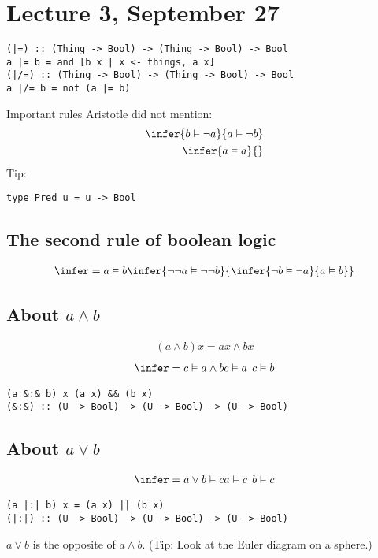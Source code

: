 \documentclass{article}
\begin{document}
\section{Lecture 3, September 27}
\begin{verbatim}
(|=) :: (Thing -> Bool) -> (Thing -> Bool) -> Bool
a |= b = and [b x | x <- things, a x]
(|/=) :: (Thing -> Bool) -> (Thing -> Bool) -> Bool
a |/= b = not (a |= b)
\end{verbatim}
Important rules Aristotle did not mention:
\begin{align}
	\infer{b \vDash \neg a}{a \vDash \neg b} \\
	\infer{a \vDash a}{}
\end{align}
Tip:
\begin{verbatim}
type Pred u = u -> Bool
\end{verbatim}
\subsection{The second rule of boolean logic}
\begin{align}
	\infer={a\vDash b}{
	\infer{\neg\neg a \vDash \neg\neg b}{
		\infer{\neg b \vDash \neg a}{
			a \vDash b
		}
	}
	}
\end{align}
\subsection{About $a\wedge b$}
\begin{align}
	(a\wedge b)x = ax \wedge bx
\end{align}
\begin{align}
	\infer={c\vDash a\wedge b}{c\vDash a \:\: c\vDash b}
\end{align}
\begin{verbatim}
(a &:& b) x (a x) && (b x)
(&:&) :: (U -> Bool) -> (U -> Bool) -> (U -> Bool)
\end{verbatim}
\subsection{About $a\vee b$}
\begin{align}
	\infer={a\vee b \vDash c}{a \vDash c \:\: b\vDash c}
\end{align}
\begin{verbatim}
(a |:| b) x = (a x) || (b x)
(|:|) :: (U -> Bool) -> (U -> Bool) -> (U -> Bool)
\end{verbatim}
$a\vee b$ is the opposite of $a\wedge b$. (Tip: Look at the Euler diagram on a sphere.)
\end{document}
